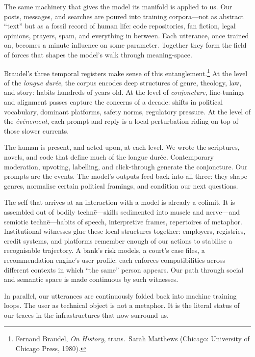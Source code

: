\documentclass[12pt,a4paper]{article}
\begin{document}
The same machinery that gives the model its manifold is applied to us. Our posts, messages, and searches are poured into training corpora---not as abstract ``text'' but as a fossil record of human life: code repositories, fan fiction, legal opinions, prayers, spam, and everything in between. Each utterance, once trained on, becomes a minute influence on some parameter. Together they form the field of forces that shapes the model's walk through meaning-space.

Braudel's three temporal registers make sense of this entanglement.\footnote{Fernand Braudel, \emph{On History}, trans.\ Sarah Matthews (Chicago: University of Chicago Press, 1980).} At the level of the \emph{longue dur\'ee}, the corpus encodes deep structures of genre, theology, law, and story: habits hundreds of years old. At the level of \emph{conjoncture}, fine-tunings and alignment passes capture the concerns of a decade: shifts in political vocabulary, dominant platforms, safety norms, regulatory pressure. At the level of the \emph{\'ev\'enement}, each prompt and reply is a local perturbation riding on top of those slower currents.

The human is present, and acted upon, at each level. We wrote the scriptures, novels, and code that define much of the longue dur\'ee. Contemporary moderation, upvoting, labelling, and click-through generate the conjoncture. Our prompts are the events. The model's outputs feed back into all three: they shape genres, normalise certain political framings, and condition our next questions.

The self that arrives at an interaction with a model is already a colimit. It is assembled out of bodily techn\={e}---skills sedimented into muscle and nerve---and semiotic techn\={e}---habits of speech, interpretive frames, repertoires of metaphor. Institutional witnesses glue these local structures together: employers, registries, credit systems, and platforms remember enough of our actions to stabilise a recognisable trajectory. A bank's risk models, a court's case files, a recommendation engine's user profile: each enforces compatibilities across different contexts in which ``the same'' person appears. Our path through social and semantic space is made continuous by such witnesses.

In parallel, our utterances are continuously folded back into machine training loops. The user as technical object is not a metaphor. It is the literal status of our traces in the infrastructures that now surround us.
\end{document}
